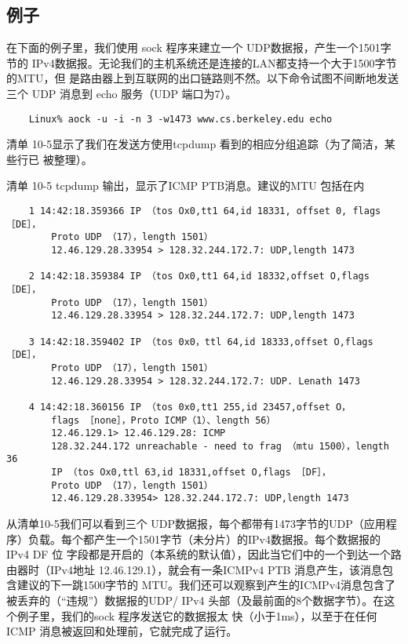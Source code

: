 \subsection{例子}
在下面的例子里，我们使用 sock 程序来建立一个 UDP数据报，产生一个1501字节的
IPv4数据报。无论我们的主机系统还是连接的LAN都支持一个大于1500字节的MTU，但
是路由器上到互联网的出口链路则不然。以下命令试图不间断地发送三个 UDP 消息到 echo
服务（UDP 端口为7）。

\begin{verbatim}
    Linux% aock -u -i -n 3 -w1473 www.cs.berkeley.edu echo
\end{verbatim}

清单 10-5显示了我们在发送方使用tcpdump 看到的相应分组追踪（为了简洁，某些行已
被整理）。

清单 10-5 tcpdump 输出，显示了ICMP PTB消息。建议的MTU 包括在内

\begin{verbatim}
    1 14:42:18.359366 IP （tos Ox0,tt1 64,id 18331, offset 0, flags ［DE］，
        Proto UDP （17），length 1501）
        12.46.129.28.33954 > 128.32.244.172.7: UDP,length 1473

    2 14:42:18.359384 IP （tos Ox0,tt1 64,id 18332,offset O,flags ［DE］，
        Proto UDP （17），length 1501）
        12.46.129.28.33954 > 128.32.244.172.7: UDP,length 1473

    3 14:42:18.359402 IP （tos 0x0，ttl 64,id 18333,offset O,flags ［DE］，
        Proto UDP （17），length 1501）
        12.46.129.28.33954 > 128.32.244.172.7: UDP. Lenath 1473

    4 14:42:18.360156 IP （tos 0x0,tt1 255,id 23457,offset O，
        flags ［none］，Proto ICMP（1）、length 56）
        12.46.129.1> 12.46.129.28: ICMP
        128.32.244.172 unreachable - need to frag （mtu 1500），length 36
        IP （tos Ox0,ttl 63,id 18331,offset O,flags ［DF］，
        Proto UDP （17），length 1501）
        12.46.129.28.33954> 128.32.244.172.7: UDP,length 1473
\end{verbatim}

从清单10-5我们可以看到三个 UDP数据报，每个都带有1473字节的UDP（应用程
序）负载。每个都产生一个1501字节（未分片）的IPv4数据报。每个数据报的IPv4 DF 位
字段都是开启的（本系统的默认值），因此当它们中的一个到达一个路由器时（IPv4地址
12.46.129.1），就会有一条ICMPv4 PTB 消息产生，该消息包含建议的下一跳1500字节的
MTU。我们还可以观察到产生的ICMPv4消息包含了被丢弃的（“违规”）数据报的UDP/
IPv4 头部（及最前面的8个数据字节）。在这个例子里，我们的sock 程序发送它的数据报太
快（小于1ms），以至于在任何ICMP 消息被返回和处理前，它就完成了运行。

